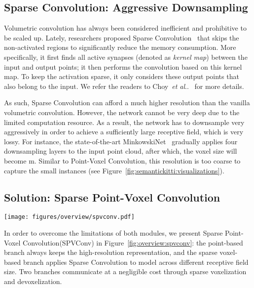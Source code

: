 \documentclass[runningheads]{llncs}
\makeatletter
\newcommand{\fig}[1]{Figure~\ref{#1}}
\DeclareRobustCommand\onedot{\futurelet\@let@token\@onedot}
\def\@onedot{\ifx\@let@token.\else.\null\fi\xspace}
\def\etal{\emph{et al}\onedot}
\def\module{Sparse Point-Voxel Convolution\xspace}
\def\moduleshort{SPVConv\xspace}
\makeatother
\begin{document}
\subsection{Sparse Convolution: Aggressive Downsampling}

Volumetric convolution has always been considered inefficient and prohibitive to be scaled up. Lately, researchers proposed Sparse Convolution~\cite{graham20183d,choy20194d} that skips the non-activated regions to significantly reduce the memory consumption. More specifically, it first finds all active synapses (denoted as \textit{kernel map}) between the input and output points; it then performs the convolution based on this kernel map. To keep the activation sparse, it only considers these output points that also belong to the input. We refer the readers to Choy~\etal~\cite{choy20194d} for more details.

As such, Sparse Convolution can afford a much higher resolution than the vanilla volumetric convolution. However, the network cannot be very deep due to the limited computation resource. As a result, the network has to downsample very aggressively in order to achieve a sufficiently large receptive field, which is very lossy. For instance, the state-of-the-art MinkowskiNet~\cite{choy20194d} gradually applies four downsampling layers to the input point cloud, after which, the voxel size will become m. Similar to Point-Voxel Convolution, this resolution is too coarse to capture the small instances (see \fig{fig:semantickitti:visualizations}).

\subsection{Solution: \module}

\begin{figure*}[t]
\centering
\texttt{[image: figures/overview/spvconv.pdf]}
\caption{Overview of \module (\moduleshort): it equips the sparse voxel-based branch with a lightweight, high-resolution point-based branch which can capture fine details in large scenes.}
\label{fig:overview:spvconv}
\end{figure*} 
In order to overcome the limitations of both modules, we present \module (\moduleshort) in \fig{fig:overview:spvconv}: the point-based branch always keeps the high-resolution representation, and the sparse voxel-based branch applies Sparse Convolution to model across different receptive field size. Two branches communicate at a negligible cost through sparse voxelization and devoxelization.
\end{document}
